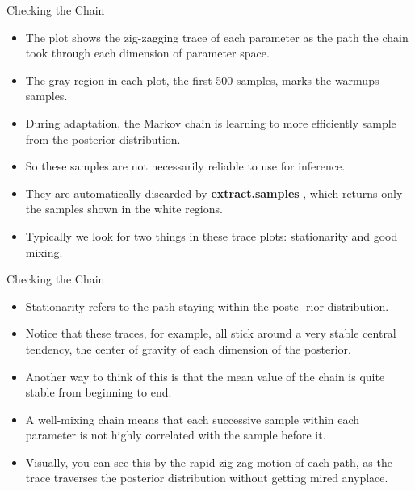 \documentclass[handout]{beamer}
\begin{document}
\begin{frame}[fragile]{Checking the Chain }
\scriptsize{


\begin{itemize}


\item The plot shows the zig-zagging trace of each parameter as the path the chain took through each dimension of parameter space.

\item The gray region in each plot, the first 500 samples, marks the warmups samples.

\item During adaptation, the Markov chain is learning to more efficiently sample from the posterior distribution.

\item So these samples are not necessarily reliable to use for inference. 
\item They are automatically discarded by \textbf{extract.samples} , which returns only the samples shown in the white regions.


\item Typically we look for two things in these trace plots: stationarity and good mixing. 

 \end{itemize}




} 
\end{frame}


\begin{frame}[fragile]{Checking the Chain }
\scriptsize{


\begin{itemize}


\item Stationarity refers to the path staying within the poste-
rior distribution. 

\item Notice that these traces, for example, all stick around a very stable central tendency, the center of gravity of each dimension of the posterior.

\item Another way to think of this is that the mean value of the chain is quite stable from beginning to end.

\item A well-mixing chain means that each successive sample within each parameter is not highly correlated with the sample before it.

\item Visually, you can see this by the rapid zig-zag motion of each path, as the trace traverses the posterior distribution without getting mired
anyplace.

 \end{itemize}




} 
\end{frame}
\end{document}
